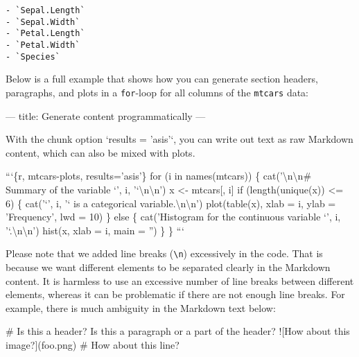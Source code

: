 \documentclass[
  11pt,
]{krantz}
\newenvironment{Shaded}{\begin{snugshade}}{\end{snugshade}}
\newcommand{\AlertTok}[1]{\textcolor[rgb]{0.33,0.33,0.33}{#1}}
\newcommand{\BaseNTok}[1]{\textcolor[rgb]{0.06,0.06,0.06}{#1}}
\newcommand{\FunctionTok}[1]{\textcolor[rgb]{0,0,0}{#1}}
\newcommand{\NormalTok}[1]{#1}
\begin{document}
\begin{verbatim}
- `Sepal.Length`
- `Sepal.Width`
- `Petal.Length`
- `Petal.Width`
- `Species`
\end{verbatim}

Below is a full example that shows how you can generate section headers, paragraphs, and plots in a \texttt{for}-loop for all columns of the \texttt{mtcars} data:

\begin{Shaded}
\begin{Highlighting}[]
\NormalTok{---}
\NormalTok{title: Generate content programmatically}
\NormalTok{---}

\NormalTok{With the chunk option }\BaseNTok{`results = 'asis'`}\NormalTok{, you can}
\NormalTok{write out text as raw Markdown content, which can}
\NormalTok{also be mixed with plots.}

\BaseNTok{```\{r, mtcars-plots, results='asis'\}}
\BaseNTok{for (i in names(mtcars)) \{}
\BaseNTok{  cat('\textbackslash{}n\textbackslash{}n# Summary of the variable `', i, '`\textbackslash{}n\textbackslash{}n')}
\BaseNTok{  x <- mtcars[, i]}
\BaseNTok{  if (length(unique(x)) <= 6) \{}
\BaseNTok{    cat('`', i, '` is a categorical variable.\textbackslash{}n\textbackslash{}n')}
\BaseNTok{    plot(table(x), xlab = i, ylab = 'Frequency', lwd = 10)}
\BaseNTok{  \} else \{}
\BaseNTok{    cat('Histogram for the continuous variable `', i, '`.\textbackslash{}n\textbackslash{}n')}
\BaseNTok{    hist(x, xlab = i, main = '')}
\BaseNTok{  \}}
\BaseNTok{\}}
\BaseNTok{```}
\end{Highlighting}
\end{Shaded}

Please note that we added line breaks (\texttt{\textbackslash{}n}) excessively in the code. That is because we want different elements to be separated clearly in the Markdown content. It is harmless to use an excessive number of line breaks between different elements, whereas it can be problematic if there are not enough line breaks. For example, there is much ambiguity in the Markdown text below:

\begin{Shaded}
\begin{Highlighting}[]
\FunctionTok{# Is this a header?}
\NormalTok{Is this a paragraph or a part of the header?}
\AlertTok{![How about this image?](foo.png)}
\FunctionTok{# How about this line?}
\end{Highlighting}
\end{Shaded}
\end{document}
